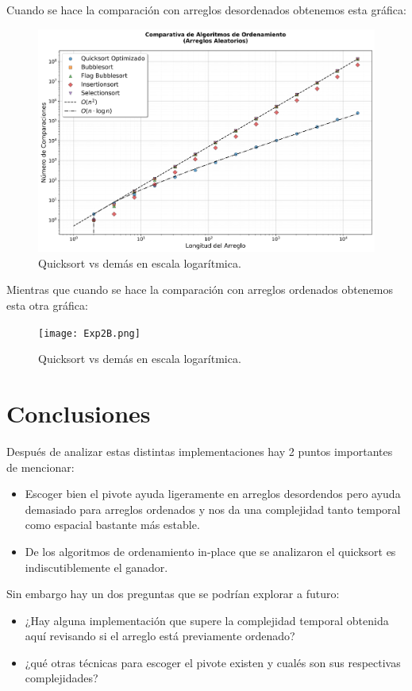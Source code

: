 \documentclass[conference]{IEEEtran}
\begin{document}
Cuando se hace la comparación con arreglos desordenados obtenemos esta gráfica:

\begin{figure}[H]
    \centering
    \includegraphics[scale=0.3]{Exp2A.png}
    \caption{Quicksort vs demás en escala logarítmica.}\label{fig:exp2A}
\end{figure}

Mientras que cuando se hace la comparación con arreglos ordenados obtenemos esta otra gráfica:

\begin{figure}[H]
    \centering
    \texttt{[image: Exp2B.png]}
    \caption{Quicksort vs demás en escala logarítmica.}\label{fig:exp2B}
\end{figure}



\section{Conclusiones}

Después de analizar estas distintas implementaciones hay 2 puntos importantes de mencionar:

\begin{itemize}
    \item Escoger bien el pivote ayuda ligeramente en arreglos desordendos pero ayuda demasiado para arreglos ordenados y nos da una complejidad tanto temporal como espacial bastante más estable.
    \item De los algoritmos de ordenamiento in-place que se analizaron el quicksort es indiscutiblemente el ganador.
\end{itemize}

Sin embargo hay un dos preguntas que se podrían explorar a futuro:
\begin{itemize}
    \item ¿Hay alguna implementación que supere la complejidad temporal obtenida aquí revisando si el arreglo está previamente ordenado? 
    \item ¿qué otras técnicas para escoger el pivote existen y cualés son sus respectivas complejidades?
\end{itemize}
\end{document}

